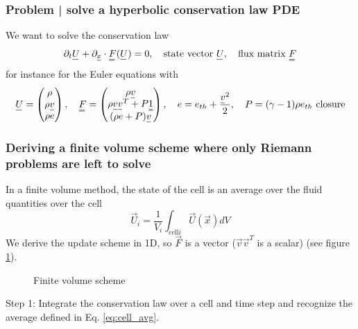 \subsubsection{Problem | solve a hyperbolic conservation law PDE}
We want to solve the conservation law
\begin{equation}
    \partial_t \vec{U} + \partial_\vec{x} \cdot \mat{F}(\vec{U}) = 0, \quad \text{state vector } \vec{U}, \quad \text{flux matrix } \mat{F}
\end{equation}
for instance for the Euler equations with
\begin{equation}
    \label{eq:euler_equations_vec}
    \vec{U} = \begin{pmatrix} \rho \\ \rho \vec{v} \\ \rho e \end{pmatrix}, \quad \mat{F} = \begin{pmatrix} \rho \vec{v} \\ \rho \vec{v} \vec{v}^T + P \mat{1} \\ (\rho e + P) \vec{v} \end{pmatrix}, \quad e = e_{th} + \frac{\vec{v}^2}{2}, \quad P = (\gamma - 1) \rho e_{th} \text{ closure}
\end{equation}

\subsubsection{Deriving a finite volume scheme where only Riemann problems are left to solve}
In a finite volume method, the state of the cell is an average over the fluid quantities over the cell
\begin{equation}
    \label{eq:cell_avg}
    \vec{U}_i = \frac{1}{V_i} \int_{\text{cell} i}{\vec{U}(\vec{x})} dV
\end{equation}
We derive the update scheme in 1D, so $\vec{F}$ is a vector ($\vec{v}\vec{v}^T$ is a scalar) (see figure \ref{fig:finite_volume_scheme}).

\begin{figure}[htb!]
    \centering
    
    \caption{Finite volume scheme}
    \label{fig:finite_volume_scheme}
\end{figure}

\textcolor{blue1}{Step 1}: Integrate the conservation law over a cell and time step and recognize the average
defined in Eq. \ref{eq:cell_avg}.

